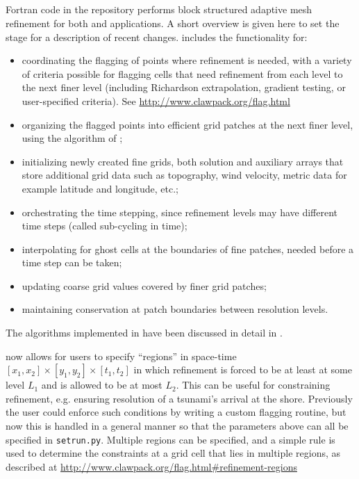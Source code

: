 %
%
%

\subsection{\amrclaw}
Fortran code in the \amrclaw repository performs block structured adaptive mesh
refinement \cite{BO,BC} for both 
\clawpack and \geoclaw  applications.
A short overview is given
here to set the stage for a description of recent changes.
\amrclaw includes the functionality for: 
\begin{itemize}
\item
coordinating the flagging of points where refinement is needed,
with a variety of criteria possible for flagging cells that need refinement
from each level to the next finer level (including Richardson extrapolation,
gradient testing, or user-specified criteria).  See
\url{http://www.clawpack.org/flag.html}
\item
organizing the flagged points into efficient grid
patches at the next finer level, using the algorithm of
\cite{mjb-rig:cluster};
\item
initializing newly created fine grids, both solution and auxiliary arrays that store additional grid data such as topography, wind velocity, metric data for example latitude and longitude, etc.;
\item
orchestrating the time stepping, since refinement levels may have
different time steps ({called sub-cycling in time});
\item
interpolating for ghost cells at the boundaries of fine patches,
needed before a time step can be taken;
\item
updating coarse grid values covered by finer grid patches;
\item
maintaining conservation at patch boundaries between resolution levels.
\end{itemize}
The algorithms implemented in \amrclaw have been discussed in detail in
\cite{mjb-rjl:amrclaw,LeVequeGeorgeBerger:an11}. 

\amrclaw now allows for users to specify ``regions'' in space-time 
$[x_1,x_2] \times [y_1,y_2] \times [t_1,t_2]$ in which refinement is forced to
be at least at some level $L_1$ and is allowed to be at most $L_2$.  This can be
useful for constraining refinement, e.g. ensuring resolution of a tsunami's
arrival at the shore.
Previously the user could enforce such conditions by writing a custom
flagging routine, but now this is handled in a general manner so that the
parameters above can all be specified in \texttt{setrun.py}.  Multiple
regions can be specified, and a simple rule is used to determine the
constraints at a grid cell that lies in multiple regions, as described at
\url{http://www.clawpack.org/flag.html#refinement-regions}

